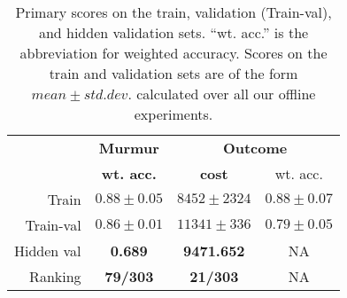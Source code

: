 
\begin{table}[!htp]
\centering
\begin{tabular}{r|c|c|c}
    \hline
    & \textbf{Murmur} & \multicolumn{2}{c}{\textbf{Outcome}} \\
    & \textbf{wt. acc.} & \multicolumn{1}{c}{\textbf{cost}} & \multicolumn{1}{c}{wt. acc.} \\ \hline
    Train & $0.88\pm 0.05$ & $8452\pm 2324$ & $0.88\pm 0.07$ \\
    Train-val & $0.86\pm 0.01$ & $11341\pm 336$ & $0.79\pm 0.05$ \\ \hline
    Hidden val & \textbf{0.689} & \textbf{9471.652} & NA \\
    Ranking & \textbf{79/303} & \textbf{21/303} & NA \\ \hline
\end{tabular}
\caption{Primary scores on the train, validation (Train-val), and hidden validation sets. ``wt. acc.'' is the abbreviation for weighted accuracy. Scores on the train and validation sets are of the form $mean \pm std. dev.$ calculated over all our offline experiments.}
\label{tab:challenge_scores}
\end{table}

